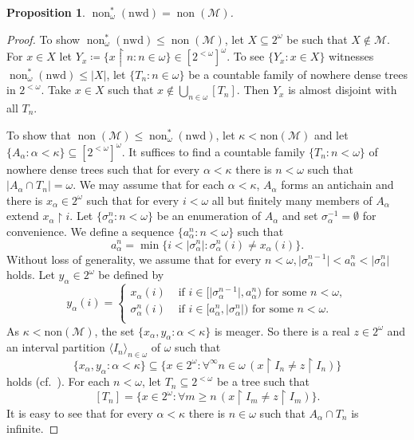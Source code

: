 \documentclass[a4paper,12pt]{amsart}
\newtheorem{prop}[thm]{Proposition}
\theoremstyle{definition}
\numberwithin{thm}{section}
\numberwithin{equation}{section}
\newcommand{\on}{\mathpunct{\upharpoonright}}
\newcommand{\m}{\mathcal{M}}
\DeclareMathOperator{\non}{non}
\newcommand{\nwd}{\mathrm{nwd}}
\renewcommand{\subset}{\subseteq}
\begin{document}
    \begin{prop}\label{prop:nonstar_omega_of_nwd}
        $\non^*_\omega(\nwd) = \non(\m)$.
    \end{prop}
    \begin{proof}
        To show $\non^*_\omega(\nwd)\leq\non(\m)$, let $X\subseteq2^\omega$ be such that $X\notin\m$. For $x\in X$ let $Y_x\coloneqq\{x\on n:n\in\omega\}\in[2^{<\omega}]^\omega$. To see $\{Y_x:x\in X\}$ witnesses $\non^*_\omega(\nwd)\leq|X|$, let $\{T_n:n\in\omega\}$ be a countable family of nowhere dense trees in $2^{<\omega}$. Take $x\in X$ such that $x\notin\bigcup_{n\in\omega}[T_n]$. Then $Y_x$ is almost disjoint with all $T_n$. 
        
        To show that $\non(\m)\leq\non^*_\omega(\nwd)$, let $\kappa<\mathrm{non}(\mathcal{M})$ and let $\{A_{\alpha}:\alpha<\kappa\}\subset[2^{<\omega}]^\omega$. It suffices to find a countable family $\{T_n:n<\omega\}$ of nowhere dense trees such that for every $\alpha<\kappa$ there is $n<\omega$ such that $\rvert A_\alpha\cap T_n\rvert=\omega$.
        We may assume that for each $\alpha<\kappa$, $A_\alpha$ forms an antichain and there is $x_{\alpha}\in 2^{\omega}$ such that for every $i<\omega$ all but finitely many members of $A_\alpha$ extend $x_{\alpha}\upharpoonright i$. Let $\{\sigma_\alpha^n:n<\omega\}$ be an enumeration of $A_\alpha$ and set $\sigma_\alpha^{-1} = \emptyset$ for convenience.
        We define a sequence $\{a^n_\alpha:n<\omega\}$ such that
        \[
        a^n_\alpha=\min\{i<\lvert\sigma_{\alpha}^{n}\rvert:\sigma_{\alpha}^{n}(i)\neq x_{\alpha}(i)\}.
        \]
        Without loss of generality, we assume that for every $n<\omega, \lvert\sigma_{\alpha}^{n-1}\rvert < a_{\alpha}^n < \lvert\sigma_{\alpha}^n\rvert$ holds. Let $y_{\alpha}\in2^{\omega}$ be defined by
        \[
        y_\alpha(i) = \begin{cases}
        x_\alpha(i) & \text{ if } i\in [\lvert\sigma_{\alpha}^{n-1}\rvert, a_{\alpha}^n) \text{ for some }n<\omega,\\
        \sigma_{\alpha}^n(i) & \text{ if } i\in [a_{\alpha}^n, \lvert\sigma_{\alpha}^n\rvert) \text{ for some }n<\omega.\\
        \end{cases}
        \]
        As $\kappa<\mathrm{non}(\mathcal{M})$, the set $\{x_{\alpha},y_{\alpha}:\alpha<\kappa\}$ is meager. So there is a real $z\in2^{\omega}$ and an interval partition $\langle I_{n}\rangle_{n\in\omega}$ of $\omega$ such that 
        \[
        \{x_{\alpha},y_{\alpha}:\alpha<\kappa\}\subseteq\{x\in2^{\omega}:\forall^\infty n\in\omega\,(x\upharpoonright I_{n}\neq z\upharpoonright I_{n})\}
        \]
        holds (cf.\ \cite[Theorem 5.2]{Bla10}). For each $n<\omega$, let $T_{n}\subseteq2^{<\omega}$ be a tree such that
        \[
        [T_{n}]=\{x\in2^{\omega}:\forall m \geq n\,(x\upharpoonright I_{m}\neq z\upharpoonright I_{m})\}.
        \]
        It is easy to see that for every $\alpha<\kappa$ there is $n\in\omega$ such that $A_{\alpha}\cap T_{n}$ is infinite. 
    \end{proof}
\end{document}
